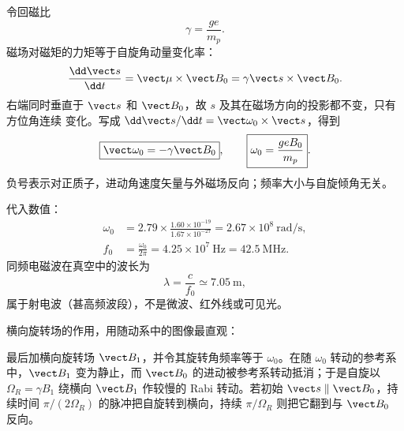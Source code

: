 \begin{xesolution}
令回磁比
\[
  \gamma=\frac{ge}{m_p}.
\]
磁场对磁矩的力矩等于自旋角动量变化率：
\begin{equation}
  \frac{\dd\vect s}{\dd t}=\vect\mu\times\vect B_0
  =\gamma\vect s\times\vect B_0.
\end{equation}
右端同时垂直于 $\vect s$ 和 $\vect B_0$，故 $s$ 及其在磁场方向的投影都不变，只有方位角连续
变化。写成 $\dd\vect s/\dd t=\vect\omega_0\times\vect s$，得到
\begin{equation}
  \boxed{\vect\omega_0=-\gamma\vect B_0},
  \qquad
  \boxed{\omega_0=\frac{geB_0}{m_p}}.
\end{equation}
负号表示对正质子，进动角速度矢量与外磁场反向；频率大小与自旋倾角无关。

代入数值：
\begin{align}
  \omega_0&=2.79\times\frac{1.60\times10^{-19}}{1.67\times10^{-27}}
  =2.67\times10^8\ \mathrm{rad/s},\\
  f_0&=\frac{\omega_0}{2\pi}=\boxed{4.25\times10^7\ \mathrm{Hz}}
  =\boxed{42.5\ \mathrm{MHz}}.
\end{align}
同频电磁波在真空中的波长为
\begin{equation}
  \boxed{\lambda=\frac{c}{f_0}\simeq7.05\ \mathrm m},
\end{equation}
属于射电波（甚高频波段），不是微波、红外线或可见光。

横向旋转场的作用，用随动系中的图像最直观：

\spinPrecessionDiagram

最后加横向旋转场 $\vect B_1$，并令其旋转角频率等于 $\omega_0$。在随 $\omega_0$ 转动的参考系
中，$\vect B_1$ 变为静止，而 $\vect B_0$ 的进动被参考系转动抵消；于是自旋以
$\boxed{\Omega_R=\gamma B_1}$ 绕横向 $\vect B_1$ 作较慢的 Rabi 转动。若初始
$\vect s\parallel\vect B_0$，持续时间
$\pi/(2\Omega_R)$ 的脉冲把自旋转到横向，持续 $\pi/\Omega_R$ 则把它翻到与 $\vect B_0$ 反向。

\end{xesolution}
